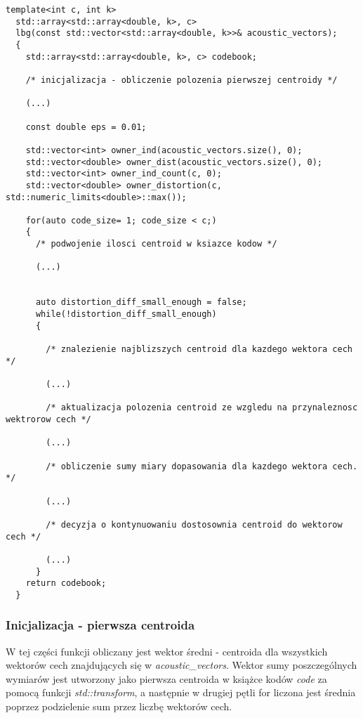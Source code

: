 \begin{lstlisting}[style=lst:cpp, caption=Ciało funkcji \textit{lbg}\label{lst:lbgbody1}]
  template<int c, int k>
  std::array<std::array<double, k>, c>
  lbg(const std::vector<std::array<double, k>>& acoustic_vectors);
  {
    std::array<std::array<double, k>, c> codebook;

    /* inicjalizacja - obliczenie polozenia pierwszej centroidy */ 

    (...)

    const double eps = 0.01; 

    std::vector<int> owner_ind(acoustic_vectors.size(), 0);
    std::vector<double> owner_dist(acoustic_vectors.size(), 0);
    std::vector<int> owner_ind_count(c, 0);
    std::vector<double> owner_distortion(c, std::numeric_limits<double>::max());

    for(auto code_size= 1; code_size < c;)
    {
      /* podwojenie ilosci centroid w ksiazce kodow */

      (...)


      auto distortion_diff_small_enough = false;
      while(!distortion_diff_small_enough)
      {

        /* znalezienie najblizszych centroid dla kazdego wektora cech */

        (...)

        /* aktualizacja polozenia centroid ze wzgledu na przynaleznosc wektrorow cech */

        (...)

        /* obliczenie sumy miary dopasowania dla kazdego wektora cech. */

        (...)

        /* decyzja o kontynuowaniu dostosownia centroid do wektorow cech */

        (...)
      }
    return codebook;
  }
\end{lstlisting}

\subsubsection{Inicjalizacja - pierwsza centroida}

W tej części funkcji obliczany jest wektor średni - centroida dla wszystkich wektorów cech znajdujących się w \textit{acoustic\_vectors}. Wektor sumy poszczególnych wymiarów jest utworzony jako pierwsza centroida w książce kodów \textit{code} za pomocą funkcji \textit{std::transform}, a następnie w drugiej pętli for liczona jest średnia poprzez podzielenie sum przez liczbę wektorów cech.

